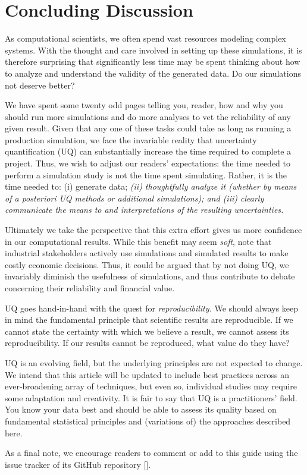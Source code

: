 \section{Concluding Discussion}

As computational scientists, we often spend vast resources modeling complex systems.  With the thought and care involved in setting up these simulations, it is therefore surprising that  significantly less time may be spent thinking about how to analyze and understand the validity of the generated data.  Do our simulations not deserve better? 

We have spent some twenty odd pages telling you, reader, how and why you should run more simulations and do more analyses to vet the reliability of any given result.  Given that any one of these tasks could take as long as running a production simulation, we face the invariable reality that uncertainty quantification (UQ) can substantially increase the time required to complete a project.
Thus, we wish to adjust our readers' expectations: the time needed to perform a simulation study is not the time spent simulating.  Rather, it is the time needed to: (i) generate data; {\it (ii) thoughtfully analyze it (whether by means of a posteriori UQ methods or additional simulations); and (iii) clearly communicate the means to and interpretations of the resulting uncertainties.}

Ultimately we take the perspective that this extra effort gives us more confidence in our computational results.  While this benefit may seem {\it soft}, note that industrial stakeholders actively use simulations and simulated results to make costly economic decisions.  Thus, it could be argued that by not doing UQ, we invariably diminish the usefulness of simulations, and thus contribute to debate concerning their reliability and financial value.

UQ goes hand-in-hand with the quest for \emph{reproducibility.}  We should always keep in mind the fundamental principle that scientific results are reproducible.  If we cannot state the certainty with which we believe a result, we cannot assess its reproducibility.  If our results cannot be reproduced, what value do they have?

UQ is an evolving field, but the underlying principles are not expected to change.
We intend that this article will be updated to include best practices across an ever-broadening array of techniques, but even so, individual studies may require some adaptation and creativity.
It is fair to say that UQ is a practitioners' field.  You know your data best and should be able to assess its quality based on fundamental statistical principles and (variations of) the approaches described here.

As a final note, we encourage readers to comment or add to this guide using the issue tracker of its GitHub repository [\githubrepository].
